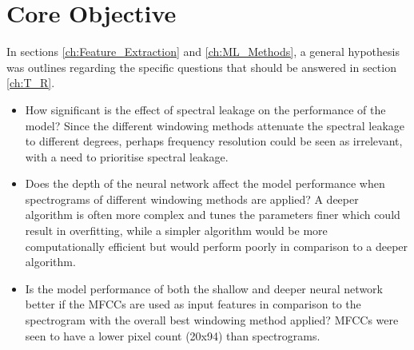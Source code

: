 % 
% 
% 
\section{Core Objective \label{ch:Objective}}
\vspace{0.5cm}

In sections \ref{ch:Feature_Extraction} and \ref{ch:ML_Methods}, a general hypothesis was outlines regarding the specific questions that should be answered in section \ref{ch:T_R}. 

\begin{itemize}
    \item How significant is the effect of spectral leakage on the performance of the model? Since the different windowing methods attenuate the spectral leakage to different degrees, perhaps frequency resolution could be seen as irrelevant, with a need to prioritise spectral leakage.
    \item Does the depth of the neural network affect the model performance when spectrograms of different windowing methods are applied? A deeper algorithm is often more complex and tunes the parameters finer which could result in overfitting, while a simpler algorithm would be more computationally efficient but would perform poorly in comparison to a deeper algorithm. 
    \item Is the model performance of both the shallow and deeper neural network better if the MFCCs are used as input features in comparison to the spectrogram with the overall best windowing method applied? MFCCs were seen to have a lower pixel count (20x94) than spectrograms. 
\end{itemize}


% 
% 
